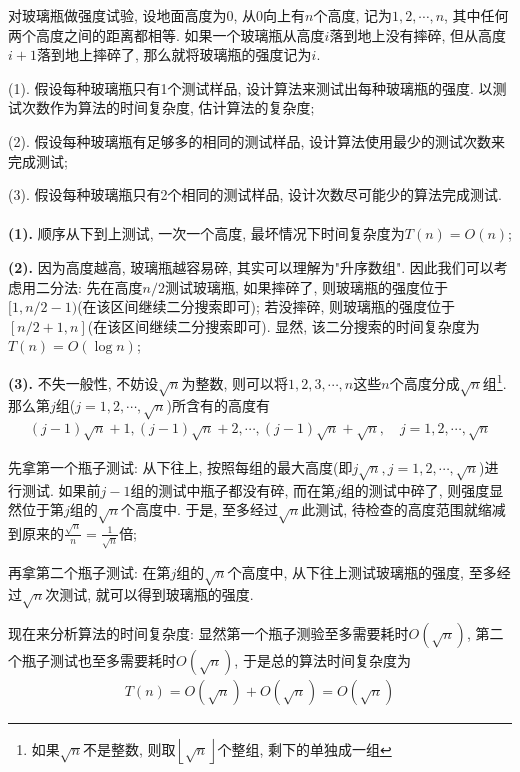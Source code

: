 \documentclass{article}
\begin{document}
\pagebreak


\begin{homeworkProblem}
	对玻璃瓶做强度试验, 设地面高度为0, 从0向上有$n$个高度, 记为$1,2,\cdots,n$, 其中任何两个高度之间的距离都相等. 如果一个玻璃瓶从高度$i$落到地上没有摔碎, 但从高度$i+1$落到地上摔碎了, 那么就将玻璃瓶的强度记为$i$.

	(1). 假设每种玻璃瓶只有1个测试样品, 设计算法来测试出每种玻璃瓶的强度. 以测试次数作为算法的时间复杂度, 估计算法的复杂度;

	(2). 假设每种玻璃瓶有足够多的相同的测试样品, 设计算法使用最少的测试次数来完成测试;

	(3). 假设每种玻璃瓶只有2个相同的测试样品, 设计次数尽可能少的算法完成测试.
	\\

	\solution
	\\

	\textbf{(1).} 顺序从下到上测试, 一次一个高度, 最坏情况下时间复杂度为$T(n)=O(n)$;

	\textbf{(2).} 因为高度越高, 玻璃瓶越容易碎, 其实可以理解为"升序数组". 因此我们可以考虑用二分法: 先在高度$n/2$测试玻璃瓶, 如果摔碎了, 则玻璃瓶的强度位于$[1,n/2-1)$(在该区间继续二分搜索即可); 若没摔碎, 则玻璃瓶的强度位于$[n/2+1,n]$(在该区间继续二分搜索即可). 显然, 该二分搜索的时间复杂度为$T(n)=O(\log n)$;
	
	\textbf{(3).} 不失一般性, 不妨设$\sqrt{n}$为整数, 则可以将$1,2,3,\cdots,n$这些$n$个高度分成$\sqrt{n}$组\footnote{如果$\sqrt{n}$不是整数, 则取$\left\lfloor \sqrt{n}\right\rfloor $个整组, 剩下的单独成一组}. 那么第$j$组($j=1,2,\cdots,\sqrt{n}$)所含有的高度有
	\begin{align}
		\left( j-1 \right) \sqrt{n}+1,\left( j-1 \right) \sqrt{n}+2,\cdots ,\left( j-1 \right) \sqrt{n}+\sqrt{n},\quad j=1,2,\cdots ,\sqrt{n}
	\end{align}

	先拿第一个瓶子测试: 从下往上, 按照每组的最大高度(即$j\sqrt{n},j=1,2,\cdots,\sqrt{n}$)进行测试. 如果前$j-1$组的测试中瓶子都没有碎, 而在第$j$组的测试中碎了, 则强度显然位于第$j$组的$\sqrt{n}$个高度中. 于是, 至多经过$\sqrt{n}$此测试, 待检查的高度范围就缩减到原来的$\frac{\sqrt{n}}{n}=\frac{1}{\sqrt{n}}$倍;

	再拿第二个瓶子测试: 在第$j$组的$\sqrt{n}$个高度中, 从下往上测试玻璃瓶的强度, 至多经过$\sqrt{n}$次测试, 就可以得到玻璃瓶的强度.

	现在来分析算法的时间复杂度: 显然第一个瓶子测验至多需要耗时$O(\sqrt{n})$, 第二个瓶子测试也至多需要耗时$O(\sqrt{n})$, 于是总的算法时间复杂度为
	\begin{align}
		T(n)=O(\sqrt{n})+O(\sqrt{n})=O(\sqrt{n})
	\end{align}
	\newpage
\end{homeworkProblem}
\end{document}
